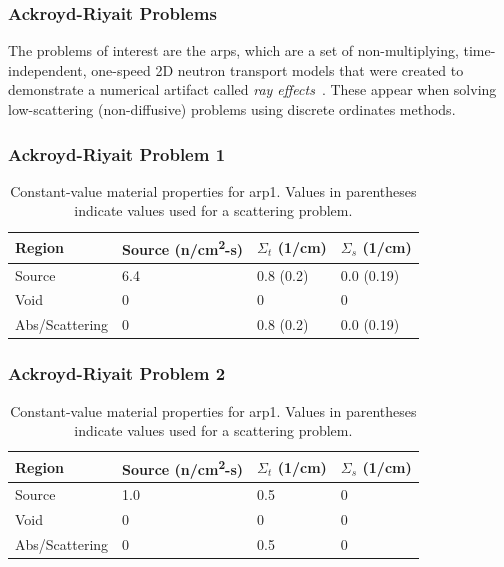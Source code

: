 \begin{frame}
  \frametitle{Ackroyd-Riyait Problems}
  The problems of interest are the \glspl{arp}, which are a set of non-multiplying, time-independent, one-speed 2D neutron transport models that were created to demonstrate a numerical artifact called \textit{ray effects}~\cite{ACKROYD19891}.
  These appear when solving low-scattering (non-diffusive) problems using discrete ordinates methods.

\end{frame}

\begin{frame}
  \frametitle{Ackroyd-Riyait Problem 1}
  
  \begin{table}
    \footnotesize
    \begin{tabular}{llll}
      \toprule
      Region         & Source (n/cm\textsuperscript{2}-s) & $\Sigma_t$ (1/cm) & $\Sigma_s$ (1/cm) \\
      \midrule
      Source         & 6.4                                & 0.8 (0.2)         & 0.0 (0.19)        \\
      Void           & 0                                  & 0                 & 0                 \\
      Abs/Scattering & 0                                  & 0.8 (0.2)         & 0.0 (0.19)        \\
      \bottomrule
    \end{tabular}
    \caption{\footnotesize Constant-value material properties for \gls{arp1}. Values in parentheses indicate values used for a scattering problem.}
    \label{tab:arp1-props}
  \end{table}
\end{frame}

\begin{frame}
  \frametitle{Ackroyd-Riyait Problem 2}
  
  \begin{table}
    \footnotesize
    \begin{tabular}{llll}
      \toprule
      Region         & Source (n/cm\textsuperscript{2}-s) & $\Sigma_t$ (1/cm) & $\Sigma_s$ (1/cm) \\
      \midrule
      Source         & 1.0                                & 0.5               & 0                 \\
      Void           & 0                                  & 0                 & 0                 \\
      Abs/Scattering & 0                                  & 0.5               & 0                 \\
      \bottomrule
    \end{tabular}
    \caption{\footnotesize Constant-value material properties for \gls{arp1}. Values in parentheses indicate values used for a scattering problem.}
    \label{tab:arp2-props}
  \end{table}
\end{frame}

